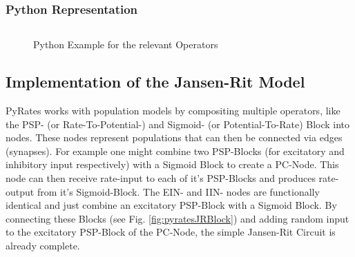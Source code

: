 \subsubsection{Python Representation}

\begin{figure}[H]
	\inputminted[mathescape, frame=lines, linenos, fontsize=\footnotesize, baselinestretch=1.2,
        bgcolor=LightGray, tabsize=4]
	{python3}{Chapters/Chapter_02_Technical_Concepts/code/python_example.py}

	\caption{Python Example for the relevant Operators}\label{fig:figure2}
\end{figure}

\subsection{Implementation of the Jansen-Rit Model}\label{subsec:implementation-of-the-jansen-rit-model}
PyRates works with population models by compositing multiple operators, like the PSP- (or Rate-To-Potential-) and Sigmoid- (or Potential-To-Rate) Block into nodes. These nodes represent populations that can then be connected via edges (synapses). For example one might combine two PSP-Blocks (for excitatory and inhibitory input respectively) with a Sigmoid Block to create a PC-Node. This node can then receive rate-input to each of it's PSP-Blocks and  produces rate-output from it's Sigmoid-Block. The EIN- and IIN- nodes are functionally identical and just combine an excitatory PSP-Block with a Sigmoid Block. By connecting these Blocks (see Fig. \ref{fig:pyratesJRBlock}) and adding random input to the excitatory PSP-Block of the PC-Node, the simple Jansen-Rit Circuit is already complete.
